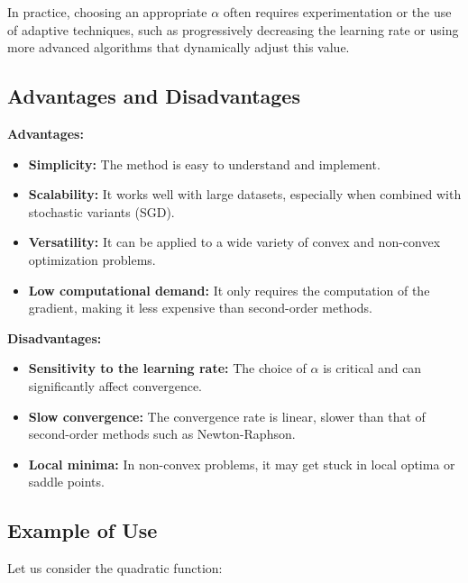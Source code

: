 \documentclass[12pt, letterpaper,conference]{IEEEtran}
\begin{document}
In practice, choosing an appropriate \( \alpha \) often requires experimentation or the use of adaptive techniques, such as progressively decreasing the learning rate or using more advanced algorithms that dynamically adjust this value.




\vspace{0.25cm}

\subsection{Advantages and Disadvantages}

\textbf{Advantages:}
\begin{itemize}
    \item \textbf{Simplicity:} The method is easy to understand and implement.
    \item \textbf{Scalability:} It works well with large datasets, especially when combined with stochastic variants (SGD).
    \item \textbf{Versatility:} It can be applied to a wide variety of convex and non-convex optimization problems.
    \item \textbf{Low computational demand:} It only requires the computation of the gradient, making it less expensive than second-order methods.
\end{itemize}

\vspace{0.15cm}

\textbf{Disadvantages:}
\begin{itemize}
    \item \textbf{Sensitivity to the learning rate:} The choice of \( \alpha \) is critical and can significantly affect convergence.
    \item \textbf{Slow convergence:} The convergence rate is linear, slower than that of second-order methods such as Newton-Raphson.
    \item \textbf{Local minima:} In non-convex problems, it may get stuck in local optima or saddle points.
\end{itemize}

\vspace{0.25cm}

\subsection{Example of Use}

Let us consider the quadratic function:
\end{document}
